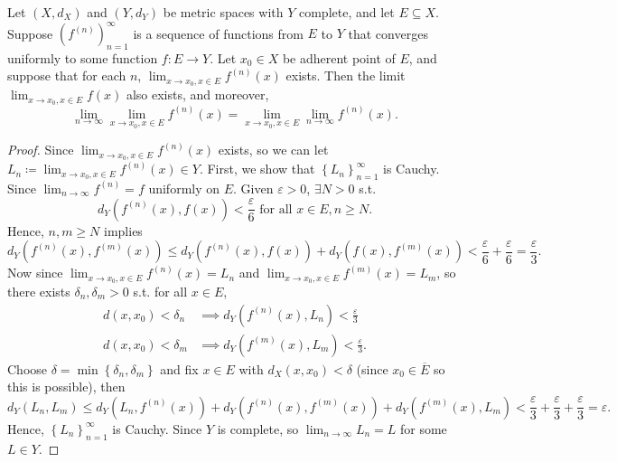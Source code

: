 \begin{proposition}
    Let \((X, d_X)\) and \((Y, d_Y)\) be metric spaces with \(Y\) complete, and let \(E \subseteq X\). Suppose \(\left( f^{(n)} \right)_{n=1}^{\infty}  \) is a sequence of functions from \(E\) to \(Y\) that converges uniformly to some function \(f:E \to Y\). Let \(x_0 \in X\) be adherent point of \(E\), and suppose that for each \(n\), \(\lim_{x \to x_0, x \in E} f^{(n)}(x)\) exists. Then the limit \(\lim_{x \to x_0, x \in E} f(x) \) also exists, and moreover, 
    \[
        \lim_{n \to \infty} \lim_{x \to x_0, x \in E} f^{(n)}(x) = \lim_{x \to x_0, x \in E} \lim_{n \to \infty}  f^{(n)}(x). 
    \]             
\end{proposition}
\begin{proof}
    Since \(\lim_{x \to x_0, x \in E} f^{(n)}(x) \) exists, so we can let \(L_n \coloneqq \lim_{x \to x_0, x \in E} f^{(n)}(x) \in Y \). First, we show that \(\left\{ L_n \right\}_{n=1}^{\infty }  \) is Cauchy. Since \(\lim_{n \to \infty} f^{(n)} = f \) uniformly on \(E\). Given \(\varepsilon > 0\), \(\exists N > 0\) s.t. 
    \[
        d_Y \left( f^{(n)}(x), f(x) \right) < \frac{\varepsilon}{6} \text{ for all } x \in E, n \ge N. 
    \] 
    Hence, \(n, m \ge N\) implies 
    \[
        d_Y \left( f^{(n)}(x), f^{(m)}(x) \right) \le d_Y \left( f^{(n)}(x), f(x) \right) + d_Y \left( f(x), f^{(m)}(x) \right) < \frac{\varepsilon}{6} + \frac{\varepsilon}{6} = \frac{\varepsilon}{3}.   
    \] Now since \(\lim_{x \to x_0, x \in E} f^{(n)}(x) = L_n \) and \(\lim_{x \to x_0, x \in E} f^{(m)}(x) = L_m\), so there exists \(\delta _n, \delta _m > 0\) s.t. for all \(x \in E\),  
    \begin{align*}
        d(x, x_0) < \delta _n &\implies d_Y \left( f^{(n)}(x), L_n \right) < \frac{\varepsilon}{3} \\
        d(x, x_0) < \delta _m &\implies d_Y \left( f^{(m)}(x), L_m \right) < \frac{\varepsilon}{3}. 
    \end{align*}  
    Choose \(\delta = \min \left\{ \delta _n, \delta _m \right\} \) and fix \(x \in E\) with \(d_X (x, x_0) < \delta \) (since \(x_0 \in \overline{E} \) so this is possible), then 
    \[
        d_Y \left( L_n, L_m \right) \le d_Y \left( L_n, f^{(n)}(x) \right) + d_Y \left( f^{(n)}(x), f^{(m)}(x) \right) + d_Y \left( f^{(m)}(x), L_m \right) < \frac{\varepsilon}{3} + \frac{\varepsilon}{3} + \frac{\varepsilon}{3} = \varepsilon.    
    \] 
    Hence, \(\left\{ L_n \right\}_{n=1}^{\infty}  \) is Cauchy. Since \(Y\) is complete, so \(\lim_{n \to \infty} L_n = L \) for some \(L \in Y\). 

\end{proof}
